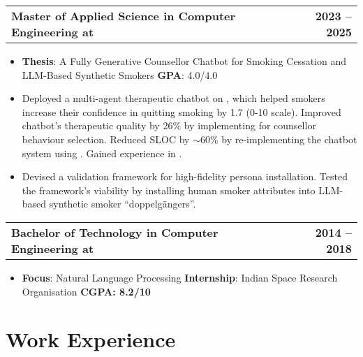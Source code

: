 \documentclass{ExpressiveResume}
\makeatletter
\newcommand{\mainBullet}{\hspace{12pt}\color{blue}\fontsize{11}{13.2}\selectfont{\ding{70}}}
\newcommand{\myresumesubsection}[2]{%
    \noindent\begin{tabular*}{\linewidth}{@{}l@{\extracolsep{\fill}}r@{}}
    {\subsectionfont\bfseries #1} & {\subsectionfont\bfseries #2}\\
  \end{tabular*}\par
}
\makeatother
\begin{document}
\myresumesubsection{\mainBullet Master of Applied Science in Computer Engineering at \tech{the University of Toronto}}{2023 -- 2025}
\begin{itemize}[leftmargin=*, label={}]
    \item \textbf{Thesis}: A Fully Generative Counsellor Chatbot for Smoking Cessation and LLM-Based Synthetic Smokers \hspace{1pt}\textbar\hspace{1pt} \textbf{GPA}: 4.0/4.0
    \item Deployed a multi-agent therapeutic chatbot \cite{mahmood2025fullygenerativemotivationalinterviewing} on , which helped smokers increase their confidence in quitting smoking by 1.7 (0-10 scale). Improved chatbot's therapeutic quality by 26\% by implementing  for counsellor behaviour selection. Reduced SLOC by $\sim$60\% by re-implementing the chatbot system using . Gained experience in .
    \item Devised a validation framework for high-fidelity persona installation. Tested the framework's viability by installing human smoker attributes into LLM-based  synthetic smoker ``doppelgängers''.
\end{itemize}

\myresumesubsection{\mainBullet Bachelor of Technology in Computer Engineering at \tech{Jamia Millia Islamia, New Delhi}}{2014 -- 2018}
\begin{itemize}[leftmargin=*, label={}]
    \item \textbf{Focus}: Natural Language Processing \hspace{1pt}\textbar\hspace{1pt} \textbf{Internship}: Indian Space Research Organisation \hspace{1pt}\textbar\hspace{1pt} \textbf{CGPA: 8.2/10}
\end{itemize}

\section{Work Experience}
\end{document}
